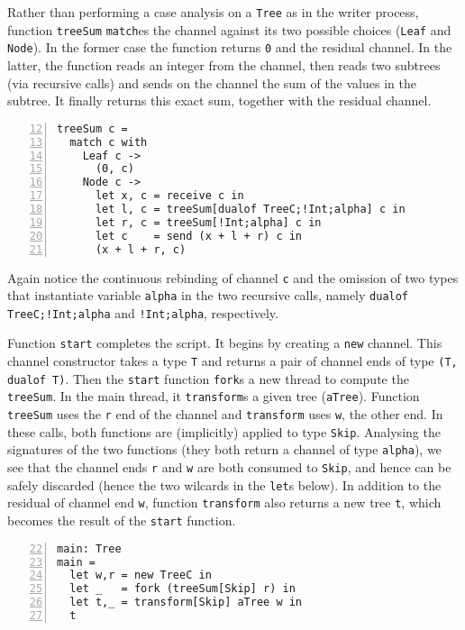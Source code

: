 Rather than performing a case analysis on a \lstinline|Tree| as in the
writer process, function \lstinline|treeSum| \lstinline|match|es the
channel against its two possible choices (\lstinline|Leaf| and
\lstinline|Node|). In the former case the function returns
\lstinline|0| and the residual channel. In the latter, the function
reads an integer from the channel, then reads two subtrees (via
recursive calls) and sends on the channel the sum of the values in the
subtree. It finally returns this exact sum, together with the residual
channel.
%
\label{lst:treeSum}
\begin{lstlisting}[numbers=left,firstnumber=12]
treeSum c =
  match c with
    Leaf c ->
      (0, c)
    Node c ->
      let x, c = receive c in
      let l, c = treeSum[dualof TreeC;!Int;alpha] c in
      let r, c = treeSum[!Int;alpha] c in
      let c    = send (x + l + r) c in
      (x + l + r, c)
\end{lstlisting}

Again notice the continuous rebinding of channel \lstinline|c| and the
omission of two types that instantiate variable \lstinline|alpha| in
the two recursive calls, namely \lstinline|dualof TreeC;!Int;alpha|
and \lstinline|!Int;alpha|, respectively.

Function \lstinline|start| completes the script. It begins by creating
a \lstinline|new| channel. This channel constructor takes a type
\lstinline|T| and returns a pair of channel ends of type
%
\lstinline|(T, dualof T)|. Then the \lstinline|start| function
\lstinline|fork|s a new thread to compute the \lstinline|treeSum|. In
the main thread, it \lstinline|transform|s a given tree
(\lstinline|aTree|). Function \lstinline|treeSum| uses the
\lstinline|r| end of the channel and \lstinline|transform| uses
\lstinline|w|, the other end. In these calls, both functions are
(implicitly) applied to type \lstinline|Skip|. Analysing the
signatures of the two functions (they both return a channel of type
\lstinline|alpha|), we see that the channel ends \lstinline|r| and
\lstinline|w| are both consumed to \lstinline|Skip|, and hence can be
safely discarded (hence the two wilcards in the \lstinline|let|s
below). In addition to the residual of channel end \lstinline|w|,
function \lstinline|transform| also returns a new tree \lstinline|t|,
which becomes the result of the \lstinline|start| function.
%
\begin{lstlisting}[numbers=left,firstnumber=22]
main: Tree
main =
  let w,r = new TreeC in
  let _   = fork (treeSum[Skip] r) in
  let t,_ = transform[Skip] aTree w in
  t
\end{lstlisting}

